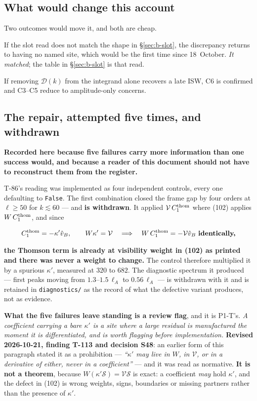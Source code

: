 \subsection{What would change this account}
Two outcomes would move it, and both are cheap.

If the slot read does not match the shape in \S\ref{sec:b-slot}, the
discrepancy returns to having no named site, which would be the first time
since 18~October. \emph{It matched}; the table in \S\ref{sec:b-slot} is that
read.

If removing $\mathcal D(k)$ from the integrand alone recovers a late ISW, C6 is
confirmed and C3--C5 reduce to amplitude-only concerns.

\subsection{The repair, attempted five times, and withdrawn}
\label{sec:repair-attempts}
\textbf{Recorded here because five failures carry more information than one
success would, and because a reader of this document should not have to
reconstruct them from the register.}

T-86's reading was implemented as four independent controls, every one
defaulting to \texttt{False}. The first combination closed the frame gap by
four orders at $\ell\ge50$ for $k\lesssim60$ --- and \textbf{is withdrawn}.
It applied $\mathcal V\,C_1^{\rm thom}$ where (102) applies
$W\,C_1^{\rm thom}$, and since

$$C_1^{\rm thom}=-\kappa'\hat v_B,\qquad W\kappa'=\mathcal V
\quad\Longrightarrow\quad W\,C_1^{\rm thom}=-\mathcal V\hat v_B\ \textbf{identically,}$$

\textbf{the Thomson term is already at visibility weight in (102) as printed
and there was never a weight to change.} The control therefore multiplied it
by a spurious $\kappa'$, measured at $320$ to $682$. The diagnostic spectrum
it produced --- first peaks moving from $1.3$--$1.5\,\ell_A$ to
$0.56\,\ell_A$ --- is withdrawn with it and is retained in
\texttt{diagnostics/} as the record of what the defective variant produces,
not as evidence.

\textbf{What the five failures leave standing is a review flag}, and it is
P1-T's. \emph{A coefficient carrying a bare $\kappa'$ is a site where a large
residual is manufactured the moment it is differentiated, and is worth flagging
before implementation.} \textbf{Revised 2026-10-21, finding T-113 and decision
S48}: an earlier form of this paragraph stated it as a prohibition ---
\emph{``$\kappa'$ may live in $W$, in $\mathcal V$, or in a derivative of
either, never in a coefficient''} --- and it was read as normative.
\textbf{It is not a theorem}, because $W(\kappa'\mathcal S)=\mathcal V\mathcal
S$ is exact: a coefficient \emph{may} hold $\kappa'$, and the defect in (102)
is wrong weights, signs, boundaries or missing partners rather than the
presence of $\kappa'$.

